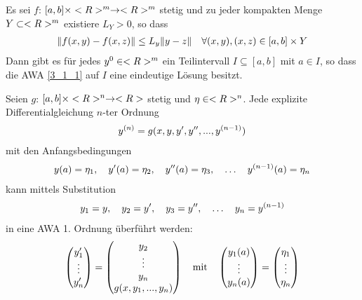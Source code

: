\begin{proposition}
	Es sei $f$: $[a,b]\times <R>^m\to<R>^m$ stetig und zu jeder kompakten Menge $Y\subset<R>^m$ existiere $L_Y>0$, so dass
	\begin{align}
		\Vert f(x,y)-f(x,z)\Vert \le L_y\Vert y-z\Vert\quad\forall (x,y),(x,z)\in [a,b]\times Y \notag
	\end{align}
	Dann gibt es für jedes $y^0\in<R>^m$ ein Teilintervall $I\subseteq [a,b]$ mit $a\in I$, so dass die AWA \cref{3_1_1} auf $I$ eine eindeutige Lösung besitzt.
\end{proposition}

Seien $g$: $[a,b]\times <R>^n\to<R>$ stetig und $\eta\in<R>^n$. Jede explizite Differentialgleichung $n$-ter Ordnung
\begin{align}
	y^{(n)} = g(x,y,y',y'',...,y^{(n-1)})\notag
\end{align}
mit den Anfangsbedingungen
\begin{align}
	y(a) = \eta_1,\quad y'(a)=\eta_2,\quad y''(a)=\eta_3,\quad\dots\quad y^{(n-1)}(a)=\eta_n\notag
\end{align}
kann mittels Substitution
\begin{align}
	y_1 = y,\quad y_2=y',\quad y_3=y'',\quad\dots\quad y_n=y^{(n-1)}\notag
\end{align}
in eine AWA 1. Ordnung überführt werden:
\begin{align}
	\begin{pmatrix}
	y_1' \\ \vdots \\ y_n'
	\end{pmatrix} = \begin{pmatrix}
	y_2 \\ \vdots \\ y_n \\ g(x,y_1,...,y_n)
	\end{pmatrix} \quad\text{mit}\quad \begin{pmatrix}
	y_1(a) \\ \vdots \\ y_n(a)
	\end{pmatrix} = \begin{pmatrix}
	\eta_1 \\ \vdots \\ \eta_n
	\end{pmatrix} \notag
\end{align}
